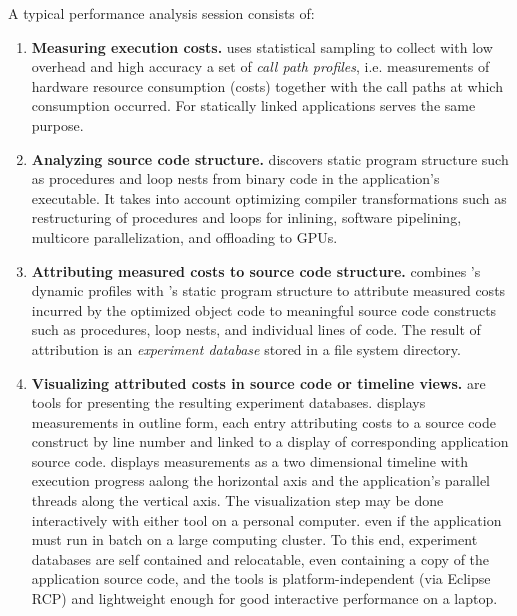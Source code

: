 \documentclass[english]{article}
\begin{document}
A typical performance analysis session consists of:
\begin{enumerate}
\item \textbf{Measuring execution costs.}  
 uses statistical sampling to collect with low overhead and high accuracy
a set of \emph{call path profiles},
i.e. measurements of hardware resource consumption (costs) together with the call paths at which consumption occurred.
For statically linked applications  serves the same purpose.

\item \textbf{Analyzing source code structure.} 
 discovers static program structure such as procedures and loop nests
from binary code in the application's executable.
It takes into account optimizing compiler transformations such as restructuring of procedures and loops
for inlining, software pipelining, multicore parallelization, and offloading to GPUs.

\item \textbf{Attributing measured costs to source code structure.} 
 combines 's dynamic profiles
with 's static program structure
to attribute measured costs incurred by the optimized object code
to meaningful source code constructs such as procedures, loop nests, and individual lines of code.
The result of attribution is an \emph{experiment database} stored in a file system directory.

\item \textbf{Visualizing attributed costs in source code or timeline views.}
are tools for presenting the resulting experiment databases.
 displays measurements in outline form,
each entry attributing costs to a source code construct by line number
and linked to a display of corresponding application source code.
 displays measurements as a two dimensional timeline
with execution progress aalong the horizontal axis
and the application's parallel threads along the vertical axis.
The visualization step may be done  interactively with either tool on a personal computer.
even if the application must run in batch on a large computing cluster.
To this end, experiment databases are self contained and relocatable,
even containing a copy of the application source code,
and the  tools
is platform-independent (via Eclipse RCP)
and lightweight enough for good interactive performance on a laptop.

\end{enumerate}
\end{document}
